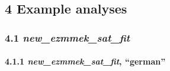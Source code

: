 \documentclass[
]{article}
\begin{document}
\hypertarget{example-analyses}{%
\subsection{4 Example analyses}\label{example-analyses}}

\hypertarget{new_ezmmek_sat_fit}{%
\subsubsection{\texorpdfstring{4.1
\emph{new\_ezmmek\_sat\_fit}}{4.1 new\_ezmmek\_sat\_fit}}\label{new_ezmmek_sat_fit}}

\hypertarget{new_ezmmek_sat_fit-german}{%
\paragraph{\texorpdfstring{4.1.1 \emph{new\_ezmmek\_sat\_fit},
``german''}{4.1.1 new\_ezmmek\_sat\_fit, ``german''}}\label{new_ezmmek_sat_fit-german}}
\end{document}
